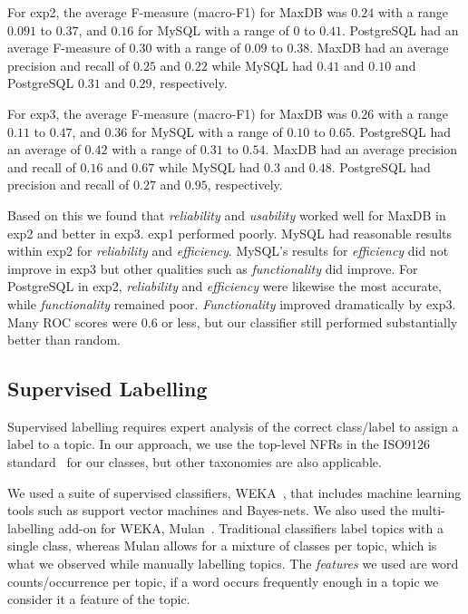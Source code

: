 \documentclass[smallextended]{svjour3}       %
\begin{document}
For \textsf{exp2}, the average F-measure (macro-F1) for MaxDB was  $0.24$ with a range $0.091$ to
$0.37$, and $0.16$ for MySQL with a range of $0$ to $0.41$. PostgreSQL had an average F-measure of $0.30$ %
 with a range of $0.09$ to $0.38$.
MaxDB had an average precision and recall of $0.25$ and $0.22$
while MySQL had $0.41$ and $0.10$ and PostgreSQL $0.31$ and $0.29$, respectively.

For \textsf{exp3}, the average F-measure (macro-F1) for MaxDB was $0.26$ with a range $0.11$ to
$0.47$, and $0.36$ for MySQL with a range of $0.10$ to $0.65$. 
PostgreSQL had an average of $0.42$ with a range of $0.31$ to $0.54$.
MaxDB had an average precision and recall of $0.16$ and $0.67$
while MySQL had $0.3$ and $0.48$. PostgreSQL had precision and recall of $0.27$ and $0.95$, respectively.

Based on this we found that \emph{reliability} and
\emph{usability} worked well for MaxDB in \textsf{exp2} and better in
\textsf{exp3}. 
\textsf{exp1} performed poorly.
MySQL had reasonable results within \textsf{exp2} for \emph{reliability} and \emph{efficiency}. 
MySQL's results for \emph{efficiency} did not improve in \textsf{exp3}
but other qualities such as \emph{functionality} did improve. 
For PostgreSQL in \textsf{exp2}, \emph{reliability} and \emph{efficiency} were likewise the most accurate,
while \emph{functionality} remained poor. \emph{Functionality} improved dramatically by \textsf{exp3}.
Many ROC scores were $0.6$ or less, but our classifier still performed substantially better than random.

\subsection{Supervised Labelling}
\label{sec:suplabelling}
Supervised labelling requires expert analysis of the correct
class/label to assign a label to a topic. In our approach, we use the top-level NFRs in the ISO9126 standard~\cite{iso9126} for our classes, but other
taxonomies are also applicable.%

We used a suite of supervised classifiers, WEKA~\cite{weka09},
that includes machine learning tools such as support vector machines and Bayes-nets. 
We also used the multi-labelling add-on for WEKA, Mulan~\cite{mulan}. %
Traditional classifiers label topics with a single class, whereas Mulan allows for a mixture of classes per topic, which is what we observed while
manually labelling topics.
The \emph{features} we used are word counts/occurrence	per topic, if
a word occurs frequently enough in a topic we consider it a feature of
the topic.
\end{document}

